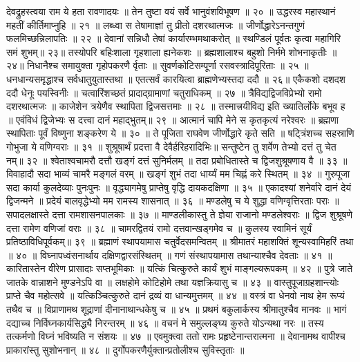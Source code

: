 देवद्रुहस्त्वया राम ये हता रावणादयः ॥
तेन तुष्टा वयं सर्वे भानुवंशविभूषण ॥ २० ॥
उद्धरस्व महास्थानं महतीं कीर्तिमाप्नुहि ॥ २१ ॥
लब्ध्वा स तेषामाज्ञां तु प्रीतो दशरथात्मजः ॥
जीर्णोद्धारेऽनन्तगुणं फलमिच्छन्निलापतिः ॥ २२ ॥
देवानां सन्निधौ तेषां कार्यारम्भमथाकरोत् ॥
स्थण्डिलं पूर्वतः कृत्वा महागिरि समं शुभम्॥ २३॥
तस्योपरि बहिःशाला गृहशाला ह्यनेकशः ॥
ब्रह्मशालाश्च बहुशो निर्ममे शोभनाकृतीः ॥ २४॥
निधानैश्च समायुक्ता गृहोपकरणै र्वृताः ॥
सुवर्णकोटिसम्पूर्णा रसवस्त्रादिपूरिताः ॥ २५ ॥
धनधान्यसमृद्धाश्च सर्वधातुयुतास्तथा ॥
एतत्सर्वं कारयित्वा ब्राह्मणेभ्यस्तदा ददौ ॥ २६॥
एकैकशो दशदश ददौ धेनूः पयस्विनीः ॥
चत्वारिंशच्छतं प्रादाद्ग्रामाणां चतुराधिकम् ॥ २७ ॥
त्रैविद्यद्विजविप्रेभ्यो रामो दशरथात्मजः ॥
काजेशेन त्रयेणैव स्थापिता द्विजसत्तमाः ॥ २८ ॥
तस्मात्त्रयीविद्य इति ख्यातिर्लोके बभूव ह ॥
एवंविधं द्विजेभ्यः स दत्त्वा दानं महाद्भुतम्॥ २९ ॥
आत्मानं चापि मेने स कृतकृत्यं नरेश्वरः ॥
ब्रह्मणा स्थापिताः पूर्वं विष्णुना शङ्करेण ये ॥ ३० ॥
ते पूजिता राघवेण जीर्णोद्धारे कृते सति ॥
षट्त्रिंशच्च सहस्राणि गोभुजा ये वणिग्वराः ॥ ३१ ॥
शुश्रूषार्थं प्रदत्ता वै देवैर्हरिहरादिभिः॥
सन्तुष्टेन तु शर्वेण तेभ्यो दत्तं तु चेत नम्॥ ३२ ॥
श्वेताश्वचामरौ दत्तौ खङ्गं दत्तं सुनिर्मलम् ॥
तदा प्रबोधितास्ते च द्विजशुश्रूषणाय वै ॥ ३३ ॥
विवाहादौ सदा भाव्यं चामरै मङ्गलं वरम् ॥
खङ्गं शुभं तदा धार्य्यं मम चिह्नं करे स्थितम् ॥ ३४ ॥
गुरुपूजा सदा कार्या कुलदेव्याः पुनःपुनः ॥
वृद्ध्यागमेषु प्राप्तेषु वृद्धि दायकदक्षिणा ॥ ३५ ॥
एकादश्यां शनेर्वारे दानं देयं द्विजन्मने ॥
प्रदेयं बालवृद्धेभ्यो मम रामस्य शासनात् ॥ ३६ ॥
मण्डलेषु च ये शुद्धा वणिग्वृत्तिरताः पराः ॥
सपादलक्षास्ते दत्ता रामशासनपालकाः ॥ ३७ ॥
माण्डलीकास्तु ते ज्ञेया राजानो मण्डलेश्वराः ॥
द्विज शुश्रूषणे दत्ता रामेण वणिजां वराः ॥ ३८ ॥
चामरद्वितयं रामो दत्तवान्खड्गमेव च ॥
कुलस्य स्वामिनं सूर्यं प्रतिष्ठाविधिपूर्वकम्॥ ३९ ॥
ब्रह्माणं स्थापयामास चतुर्वेदसमन्वितम् ॥
श्रीमातरं महाशक्तिं शून्यस्वामिहरिं तथा ॥ ४० ॥
विघ्नापध्वंसनार्थाय दक्षिणद्वारसंस्थितम् ॥
गणं संस्थापयामास तथान्याश्चैव देवताः ॥ ४१ ॥
कारितास्तेन वीरेण प्रासादाः सप्तभूमिकाः ॥
यत्किं चित्कुरुते कार्यं शुभं माङ्गल्यरूपकम् ॥ ४२ ॥
पुत्रे जाते जातके वान्नाशने मुण्डनेऽपि वा ॥
लक्षहोमे कोटिहोमे तथा यज्ञक्रियासु च ॥ ४३ ॥
वास्तुपूजाग्रहशान्त्योः प्राप्ते चैव महोत्सवे ॥
यत्किञ्चित्कुरुते दानं द्रव्यं वा धान्यमुत्तमम् ॥ ४४ ॥
वस्त्रं वा धेनवो नाथ हेम रूप्यं तथैव च ॥
विप्राणामथ शूद्राणां दीनानाथान्धकेषु च ॥ ४५ ॥
प्रथमं बकुलार्कस्य श्रीमातुश्चैव मानवः ॥
भागं दद्याच्च निर्विघ्नकार्यसिद्ध्यै निरन्तरम् ॥ ४६ ॥
वचनं मे समुल्लङ्घ्य कुरुते योऽन्यथा नरः ॥
तस्य तत्कर्मणो विघ्नं भविष्यति न संशयः ॥ ४७ ॥
एवमुक्त्वा ततो रामः प्रहृष्टेनान्तरात्मना ॥
देवानामथ वापीश्च प्राकारांस्तु सुशोभनान् ॥ ४८ ॥
दुर्गोपकरणैर्युक्तान्प्रतोलीश्च सुविस्तृताः ॥
